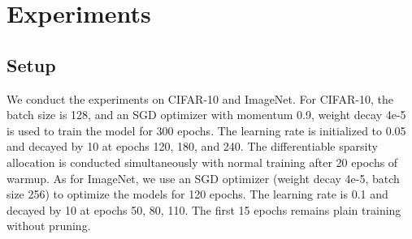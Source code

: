 \documentclass[runningheads]{llncs}
\begin{document}
  
  \section{Experiments}
  \label{sec:exp}
  \subsection{Setup}
  
  
  
  We conduct the experiments on CIFAR-10 and ImageNet. 
  For CIFAR-10, the batch size is 128, and an SGD optimizer with momentum 0.9, weight decay 4e-5 is used to train the model for 300 epochs. The learning rate is initialized to 0.05 
  and decayed by 10 at epochs 120, 180, and 240. The differentiable sparsity allocation is conducted simultaneously with normal training after 20 epochs of warmup. 
  As for ImageNet, we use an SGD optimizer (weight decay 4e-5, batch size 256) to optimize the models for 120 epochs. The learning rate is 0.1 and decayed by 10 at epochs 50, 80, 110. The first 15 epochs remains plain training without pruning. 
  
\end{document}
